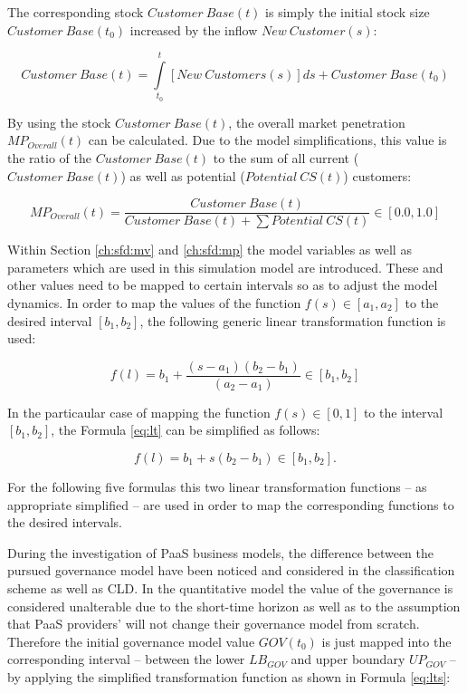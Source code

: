 The corresponding stock $Customer~Base(t)$ is simply the initial stock size $\mathit{Customer~Base(t_0)}$ increased by the inflow $New~Customer(s)$:

\begin{equation}\label{eq:cb}
	\mathit{Customer~Base(t)} = \int\limits_{t_0}^t \mathit{[New~Customers(s)]ds} + \mathit{Customer~Base(t_0)}
\end{equation}

By using the stock $Customer~Base(t)$, the overall market penetration $MP_{Overall}(t)$ can be calculated. Due to the model simplifications, this value is the ratio of the $Customer~Base(t)$ to the sum of all current \linebreak ($Customer~Base(t)$) as well as potential ($Potential~CS(t)$) customers:

\begin{equation}\label{eq:mpo}
	MP_{Overall}(t) = \frac{\mathit{Customer~Base(t)}}{\mathit{Customer~Base(t)} + \sum \mathit{Potential~CS(t)}} \in [0.0,1.0]
\end{equation}

Within Section \ref{ch:sfd:mv} and \ref{ch:sfd:mp} the model variables as well as parameters which are used in this simulation model are introduced. These and other values need to be mapped to certain intervals so as to adjust the model dynamics. In order to map the values of the function $f(s) \in [a_1,a_2]$ to the desired interval $[b_1,b_2]$, the following generic linear transformation function is used:

\begin{equation}\label{eq:lt}
	f(l) = b_{1} + \frac{(s-a_1)(b_2-b_1)}{(a_2-a_1)} \in [b_1,b_2]
\end{equation}

In the particaular case of mapping the function $f(s) \in [0,1]$ to the interval $[b_1,b_2]$, the Formula \ref{eq:lt} can be simplified as follows:

\begin{equation}\label{eq:lts}
	f(l) = b_{1} + s (b_{2}-b_{1}) \in [b_{1},b_{2}].
\end{equation}

For the following five formulas this two linear transformation functions -- as appropriate simplified -- are used in order to map the corresponding functions to the desired intervals.

During the investigation of \ac{PaaS} business models, the difference between the pursued governance model have been noticed and considered in the classification scheme as well as \ac{CLD}. In the quantitative model the value of the governance is considered unalterable due to the short-time horizon as well as to the assumption that \ac{PaaS} providers' will not change their governance model from scratch. Therefore the initial governance model value $GOV(t_0)$ is just mapped into the corresponding interval -- between the lower $LB_{GOV}$ and upper boundary $UP_{GOV}$ -- by applying the simplified transformation function as shown in Formula \ref{eq:lts}:

